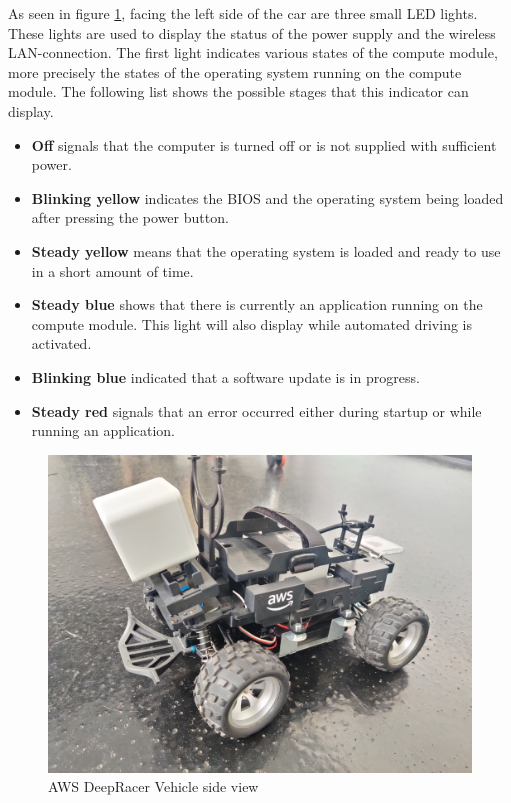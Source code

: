 As seen in figure \ref{fig:vehicle_front}, facing the left side of the car are three small LED lights. These lights are used to display the status of the power supply and the wireless LAN-connection. The first light indicates various states of the compute module, more precisely the states of the operating system running on the compute module. The following list shows the possible stages that this indicator can display.
\begin{itemize}
    \item \textbf{Off} signals that the computer is turned off or is not supplied with sufficient power.
    \item \textbf{Blinking yellow} indicates the BIOS and the operating system being loaded after pressing the power button.
    \item \textbf{Steady yellow} means that the operating system is loaded and ready to use in a short amount of time.
    \item \textbf{Steady blue} shows that there is currently an application running on the compute module. This  light will also display while automated driving is activated.
    \item \textbf{Blinking blue} indicated that a software update is in progress.
    \item \textbf{Steady red} signals that an error occurred either during startup or while running an application.
\end{itemize}

\begin{figure}
    \centering
    \includegraphics[width=.85\textwidth]{images/IMG_20201117_091128.jpg}
    \caption{AWS DeepRacer Vehicle side view}
    \label{fig:vehicle_front}
\end{figure}

